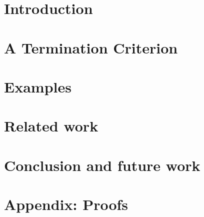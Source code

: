 \section{Introduction}
\label{sec:subgraph_counting_antipattern:intro}

  
\section{A Termination Criterion} 
\label{sec:subgraph_counting_antipattern:termination_criterion}


\section{Examples}
\label{sec:subgraph_counting_antipattern:examples}


\section{Related work}
\label{sec:subgraph_counting_antipattern:related_work} 


\section{Conclusion and future work} 
\label{sec:subgraph_counting_antipattern:conclusion}
 

\section{Appendix: Proofs}


      